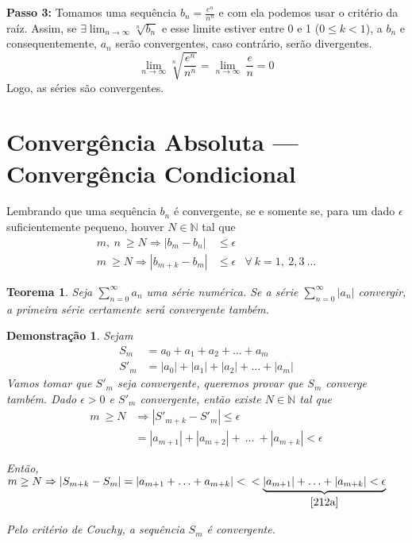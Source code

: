 \documentclass[12pt,openany]{book}
\newtheorem{theorem}{Teorema}[section]
\newtheorem{demonstration}{Demonstração}
\begin{document}
\textbf{Passo 3:} Tomamos uma sequência $b_n = \displaystyle{\frac{e^n}{n^n}}$ e com ela podemos usar o critério da raíz. Assim, se $\displaystyle{\exists \lim_{n \rightarrow \infty} \sqrt[n]{b_n}}$ e esse limite estiver entre 0 e 1 ($0 \leq k < 1$), a $b_n$ e consequentemente, $a_n$ serão convergentes, caso contrário, serão divergentes. $$\lim_{n \rightarrow \infty} \sqrt[n]{\frac{e^n}{n^n}} = \lim_{n \rightarrow \infty} \ \frac{e}{n} = 0$$ Logo, as séries são convergentes. \\
\vspace{7mm}

\section{Convergência Absoluta --- Convergência Condicional}

\hspace{5mm} Lembrando que uma sequência $b_n$ é convergente, se e somente se, para um dado $\epsilon$ suficientemente pequeno, houver $N \in \mathds{N}$ tal que \begin{align*}
m,\ n \ \geq N \Rightarrow |b_m - b_n| &\leq \epsilon \\
m \ \geq N \Rightarrow |b_{m+k} - b_m| &\leq \epsilon & \forall \ k = 1,\ 2, 3 \ \hdots
\end{align*}

\begin{theorem}
Seja $\displaystyle{\sum_{n=0}^{\infty} a_n}$ uma série numérica. Se a série $\displaystyle{\sum_{n=0}^{\infty} |a_n|}$ convergir, a primeira série certamente será convergente também.
\end{theorem}

\begin{demonstration}
Sejam \begin{align*}
S_m &= a_0 + a_1 + a_2 + \hdots + a_m \\
S'_m &= |a_0| + |a_1| + |a_2| + \hdots + |a_m|
\end{align*}
Vamos tomar que $S'_m$ seja convergente, queremos provar que $S_m$ converge também.
Dado $\epsilon > 0$ e $S'_m$ convergente, então existe $N \in \mathds{N}$ tal que \begin{align}
m \ \geq N &\Rightarrow |S'_{m+k} - S'_m| \leq \epsilon \\
&= |a_{m+1}| + |a_{m+2}| + \ \hdots \ + |a_{m+k}| < \epsilon \label{212a}
\end{align}

Então, $m \geq N \Rightarrow |S_{m+k} - S_m| = |a_{m+1} +\hdots + a_{m+k}| < \\ < \underbrace{|a_{m+1}| + \hdots + |a_{m+k}| < \epsilon}_{\ref{212a}}$

Pelo critério de Couchy, a sequência $S_m$ é convergente.
\end{demonstration}
\end{document}
